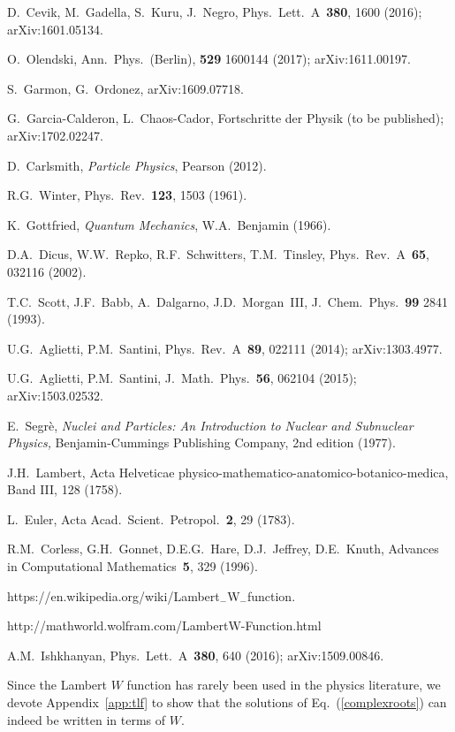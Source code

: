 \documentclass[12pt]{article}
\begin{document}
\begin{thebibliography}{99}
 D.~Cevik, M.~Gadella, S.~Kuru, J.~Negro,
Phys.~Lett.~A~{\bf 380}, 1600 (2016); {\sf arXiv:1601.05134}.

 O.~Olendski, Ann.~Phys.~(Berlin), {\bf 529} 1600144 (2017);
{\sf arXiv:1611.00197}.

 S.~Garmon, G.~Ordonez, {\sf arXiv:1609.07718}.

 G.~Garcia-Calderon, L.~Chaos-Cador,
Fortschritte der Physik (to be published); {\sf arXiv:1702.02247}.

 D.~Carlsmith, {\it Particle Physics}, Pearson (2012).

 R.G.~Winter, Phys.~Rev.~{\bf 123}, 1503 (1961).

 K.~Gottfried, {\it Quantum Mechanics}, 
W.A.~Benjamin (1966).

 D.A.~Dicus, W.W.~Repko, R.F.~Schwitters, T.M.~Tinsley,
Phys.~Rev.~A~{\bf 65}, 032116 (2002).

 T.C.~Scott, J.F.~Babb, A.~Dalgarno, J.D.~Morgan~III,
J.~Chem.~Phys.~{\bf 99} 2841 (1993).

 U.G.~Aglietti, P.M.~Santini, Phys.~Rev.~A~{\bf 89}, 
022111 (2014); {\sf arXiv:1303.4977}.

 U.G.~Aglietti, P.M.~Santini, 
J.~Math.~Phys.~{\bf 56}, 062104 (2015); {\sf arXiv:1503.02532}.

 E.~Segr\`e, {\it Nuclei and Particles: An Introduction 
to Nuclear and Subnuclear Physics,} Benjamin-Cummings Publishing Company, 
2nd edition (1977).


 J.H.~Lambert, Acta Helveticae 
physico-mathematico-anatomico-botanico-medica, Band III, 128 (1758). 

 L.~Euler, Acta Acad.~Scient.~Petropol.~{\bf 2}, 29 
(1783). 

 R.M.~Corless, G.H.~Gonnet, D.E.G.~Hare,
D.J.~Jeffrey, D.E.~Knuth, 
Advances in Computational Mathematics~{\bf 5}, 329 (1996).

 https://en.wikipedia.org/wiki/Lambert$_-$W$_-$function.

 http://mathworld.wolfram.com/LambertW-Function.html

 A.M.~Ishkhanyan, Phys.~Lett.~A~{\bf 380}, 640 (2016);
{\sf arXiv:1509.00846}.

 Since
the Lambert $W$ function has rarely been used in the physics literature,
we devote Appendix~\ref{app:tlf} to show that the solutions of
Eq.~(\ref{complexroots}) can indeed be written in terms of $W$.


\end{thebibliography}
\end{document}
